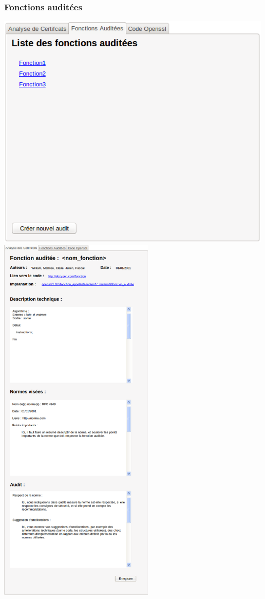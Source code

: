 \documentclass[a4paper,11pt,french]{article}
\begin{document}
\subsubsection{Fonctions auditées}
\begin{center}
\includegraphics[width=500px]{Framework/FonctionsAuditees.png}
\newpage
\includegraphics[width=280px]{Framework/FonctionsAuditees2.png}
\end{center}
\end{document}
